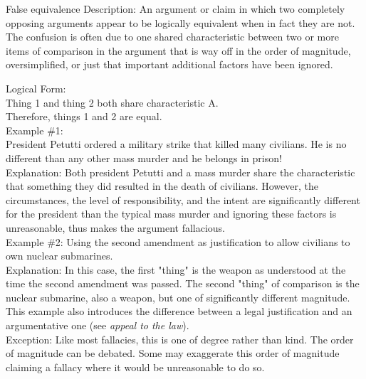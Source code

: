 \documentclass[a4paper,12pt,single,pdftex]{scrbook}
\begin{document}
False equivalence
    Description: An argument or claim in which two completely opposing arguments appear to be logically equivalent when in fact they are not. The confusion is often due to one shared characteristic between two or more items of comparison in the argument that is way off in the order of magnitude, oversimplified, or just that important additional factors have been ignored.

    
      Logical Form:
    \\

    
      Thing 1 and thing 2 both share characteristic A.
    \\

    
      Therefore, things 1 and 2 are equal.
    \\

    
      Example \#1:
    \\

    
      President Petutti ordered a military strike that killed many civilians. He is no different than any other mass murder and he belongs in prison!
    \\

    
      Explanation: Both president Petutti and a mass murder share the characteristic that something they did resulted in the death of civilians. However, the circumstances, the level of responsibility, and the intent are significantly different for the president than the typical mass murder and ignoring these factors is unreasonable, thus makes the argument fallacious.
    \\

    
      Example \#2: Using the second amendment as justification to allow civilians to own nuclear submarines.
    \\

    
      Explanation: In this case, the first "thing" is the weapon as understood at the time the second amendment was passed. The second "thing" of comparison is the nuclear submarine, also a weapon, but one of significantly different magnitude. This example also introduces the difference between a legal justification and an argumentative one (see {\it appeal to the law}).
    \\

    
      Exception: Like most fallacies, this is one of degree rather than kind. The order of magnitude can be debated. Some may exaggerate this order of magnitude claiming a fallacy where it would be unreasonable to do so.
    \\
\end{document}
